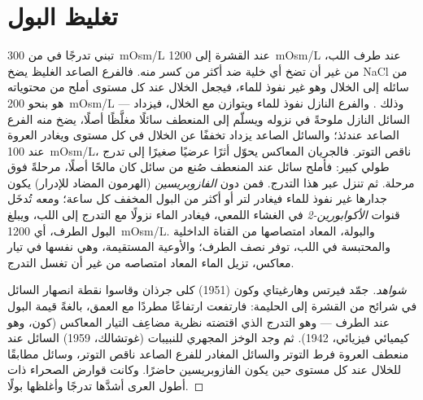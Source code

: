 \section{تغليظ البول}

\begin{proposition}\label{prop:b3:renal-osmoregulation:countercurrent}
تبني  تدرجًا في  من \qty{300}{mOsm/L} عند
القشرة إلى \qty{1200}{mOsm/L} عند طرف اللب، من غير أن تضخ أي
خلية ضد أكثر من كسر منه. فالفرع الصاعد الغليظ يضخ NaCl من
سائله إلى الخلال وهو غير نفوذ للماء، فيجعل الخلال عند كل
مستوى أملح من محتوياته هو بنحو \qty{200}{mOsm/L} --- وذلك
\emph{}. والفرع النازل نفوذ للماء ويتوازن مع
الخلال، فيزداد السائل النازل ملوحةً في نزوله ويسلّم إلى
المنعطف سائلًا مغلَّظًا أصلًا، يضخ منه الفرع الصاعد عندئذ؛
والسائل الصاعد يزداد تخففًا عن الخلال في كل مستوى ويغادر
العروة عند \qty{100}{mOsm/L}، ناقص التوتر. فالجريان المعاكس
يحوّل أثرًا عرضيًا صغيرًا إلى تدرج طولي كبير: فأملح سائل عند
المنعطف صُنع من سائل كان مالحًا أصلًا، مرحلةً فوق مرحلة. ثم
تنزل  عبر هذا التدرج. فمن دون
\emph{الفازوبريسين} (الهرمون المضاد للإدرار) يكون جدارها غير
نفوذ للماء فيغادر لتر أو أكثر من البول المخفف كل ساعة؛ ومعه
تُدخَل قنوات \emph{الأكوابورين-2} في الغشاء اللمعي، فيغادر
الماء نزولًا مع التدرج إلى اللب، ويبلغ البول  الطرف،
أي \qty{1200}{mOsm/L}. والبولة، المعاد امتصاصها من القناة
الداخلية والمحتبسة في اللب، توفر نصف  الطرف؛ والأوعية
المستقيمة، وهي نفسها في تيار معاكس، تزيل الماء المعاد امتصاصه
من غير أن تغسل التدرج.
\end{proposition}

\begin{proof}[شواهد]
جمّد فيرتس وهارغيتاي وكون (1951) كلى جرذان وقاسوا نقطة انصهار
السائل في شرائح من القشرة إلى الحليمة: فارتفعت 
ارتفاعًا مطردًا مع العمق، بالغةً قيمة البول عند الطرف ---
وهو التدرج الذي اقتضته نظرية مضاعِف التيار المعاكس (كون،
وهو كيميائي فيزيائي، 1942). ثم وجد الوخز المجهري للنبيبات
(غوتشالك، 1959) السائل عند منعطف العروة فرط التوتر والسائل
المغادر للفرع الصاعد ناقص التوتر، وسائل 
مطابقًا للخلال عند كل مستوى حين يكون الفازوبريسين حاضرًا.
وكانت قوارض الصحراء ذات أطول العرى أشدَّها تدرجًا وأغلظها
بولًا.
\end{proof}

